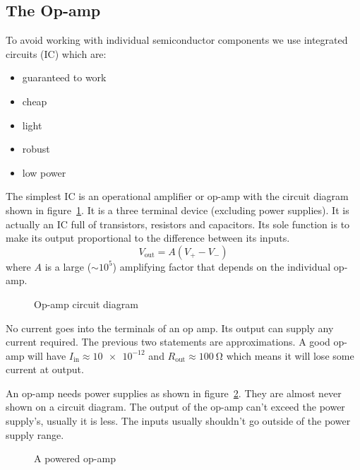 \documentclass{article}
\begin{document}
    \subsection{The Op-amp}
    To avoid working with individual semiconductor components we use integrated circuits (IC) which are:
    \begin{itemize}
        \item guaranteed to work
        \item cheap
        \item light
        \item robust
        \item low power
    \end{itemize}
    The simplest IC is an operational amplifier or op-amp with the circuit diagram shown in figure~\ref{fig:op-amp}. 
    It is a three terminal device (excluding power supplies). 
    It is actually an IC full of transistors, resistors and capacitors.
    Its sole function is to make its output proportional to the difference between its inputs.
    \[V_\text{out} = A(V_+-V_-)\]
    where \(A\) is a large (\(\sim10^5\)) amplifying factor that depends on the individual op-amp.
    \begin{figure}[ht]
        \centering
        \caption{Op-amp circuit diagram}
        \label{fig:op-amp}
    \end{figure}

    No current goes into the terminals of an op amp.
    Its output can supply any current required.
    The previous two statements are approximations. 
    A good op-amp will have \(I_\text{in}\approx\num{10e-12}\) and \(R_\text{out} \approx \SI{100}{\ohm}\) which means it will lose some current at output.
    
    An op-amp needs power supplies as shown in figure~\ref{fig:powered op-amp}. 
    They are almost never shown on a circuit diagram.
    The output of the op-amp can't exceed the power supply's, usually it is less. 
    The inputs usually shouldn't go outside of the power supply range.
    
    \begin{figure}[ht]
        \centering
        \caption{A powered op-amp}
        \label{fig:powered op-amp}
    \end{figure}
    
\end{document}
